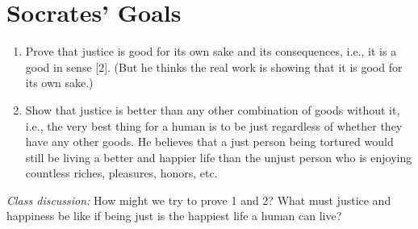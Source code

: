 \documentclass[oneside]{article}
\begin{document}





\section*{Socrates' Goals}

\begin{enumerate}
\item Prove that justice is good for its own sake and its consequences, i.e., it is a good in sense [2]. (But he thinks the real work is showing that it is good for its own sake.)
\item Show that justice is better than any other combination of goods without it, i.e., the very best thing for a human is to be just regardless of whether they have any other goods. He believes that a just person being tortured would still be living a better and happier life than the unjust person who is enjoying countless riches, pleasures, honors, etc.
\end{enumerate}

\noindent \emph{Class discussion:} How might we try to prove 1 and 2? What must justice and happiness be like if being just is the happiest life a human can live? 


\end{document}
